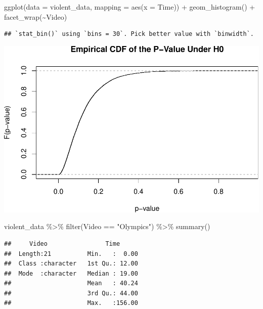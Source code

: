\documentclass[
]{article}
\newenvironment{Shaded}{\begin{snugshade}}{\end{snugshade}}
\newcommand{\AttributeTok}[1]{\textcolor[rgb]{0.77,0.63,0.00}{#1}}
\newcommand{\FunctionTok}[1]{\textcolor[rgb]{0.00,0.00,0.00}{#1}}
\newcommand{\NormalTok}[1]{#1}
\newcommand{\SpecialCharTok}[1]{\textcolor[rgb]{0.00,0.00,0.00}{#1}}
\newcommand{\StringTok}[1]{\textcolor[rgb]{0.31,0.60,0.02}{#1}}
\begin{document}
\begin{Shaded}
\begin{Highlighting}[]
\FunctionTok{ggplot}\NormalTok{(}\AttributeTok{data =}\NormalTok{ violent\_data,}
       \AttributeTok{mapping =} \FunctionTok{aes}\NormalTok{(}\AttributeTok{x =}\NormalTok{ Time)) }\SpecialCharTok{+}
  \FunctionTok{geom\_histogram}\NormalTok{() }\SpecialCharTok{+}
  \FunctionTok{facet\_wrap}\NormalTok{(}\SpecialCharTok{\textasciitilde{}}\NormalTok{Video)}
\end{Highlighting}
\end{Shaded}

\begin{verbatim}
## `stat_bin()` using `bins = 30`. Pick better value with `binwidth`.
\end{verbatim}

\includegraphics{Homework1_files/figure-latex/unnamed-chunk-5-2.pdf}

\begin{Shaded}
\begin{Highlighting}[]
\NormalTok{violent\_data }\SpecialCharTok{\%\textgreater{}\%} 
  \FunctionTok{filter}\NormalTok{(Video }\SpecialCharTok{==} \StringTok{"Olympics"}\NormalTok{) }\SpecialCharTok{\%\textgreater{}\%} 
  \FunctionTok{summary}\NormalTok{()}
\end{Highlighting}
\end{Shaded}

\begin{verbatim}
##     Video                Time       
##  Length:21          Min.   :  0.00  
##  Class :character   1st Qu.: 12.00  
##  Mode  :character   Median : 19.00  
##                     Mean   : 40.24  
##                     3rd Qu.: 44.00  
##                     Max.   :156.00
\end{verbatim}
\end{document}
